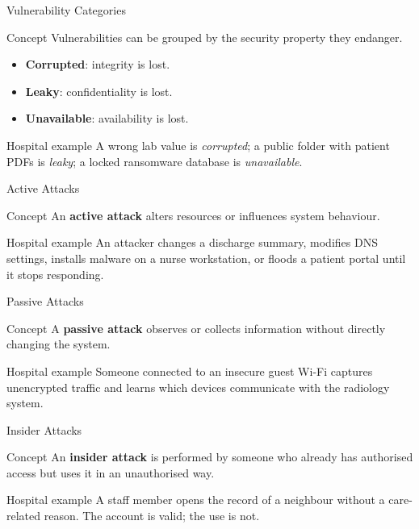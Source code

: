 \documentclass[presentation]{beamer}
\begin{document}
\begin{frame}[c]{Vulnerability Categories}
\begin{block}{Concept}
Vulnerabilities can be grouped by the security property they endanger.
\end{block}

\begin{itemize}
    \item \textbf{Corrupted}: integrity is lost.
    \item \textbf{Leaky}: confidentiality is lost.
    \item \textbf{Unavailable}: availability is lost.
\end{itemize}

\begin{exampleblock}{Hospital example}
A wrong lab value is \textit{corrupted}; a public folder with patient PDFs is \textit{leaky}; a locked
ransomware database is \textit{unavailable}.
\end{exampleblock}
\end{frame}

\begin{frame}[c]{Active Attacks}
\begin{block}{Concept}
An \textbf{active attack} alters resources or influences system behaviour.
\end{block}

\begin{exampleblock}{Hospital example}
An attacker changes a discharge summary, modifies DNS settings, installs malware on a nurse
workstation, or floods a patient portal until it stops responding.
\end{exampleblock}
\end{frame}

\begin{frame}[c]{Passive Attacks}
\begin{block}{Concept}
A \textbf{passive attack} observes or collects information without directly changing the system.
\end{block}

\begin{exampleblock}{Hospital example}
Someone connected to an insecure guest Wi-Fi captures unencrypted traffic and learns which
devices communicate with the radiology system.
\end{exampleblock}
\end{frame}

\begin{frame}[c]{Insider Attacks}
\begin{block}{Concept}
An \textbf{insider attack} is performed by someone who already has authorised access but uses it
in an unauthorised way.
\end{block}

\begin{exampleblock}{Hospital example}
A staff member opens the record of a neighbour without a care-related reason. The account is
valid; the use is not.
\end{exampleblock}
\end{frame}
\end{document}
